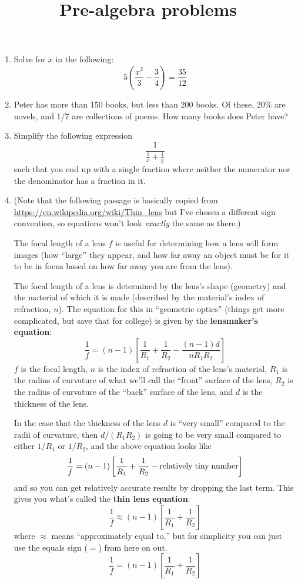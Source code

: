\documentclass[10pt,letterpaper,twoside]{article}
\title{Pre-algebra problems}
\begin{document}
 
\twocolumn
\maketitle
\begin{enumerate}
    \item Solve for $x$ in the following: $$ 5\left(\frac{x^2}{3} - \frac{3}{4} \right) = \frac{35}{12} $$
    \item Peter has more than 150 books, but less than 200 books. Of these, 20\% are novels, and 1/7 are collections of poems. How many books does Peter have?
    \item Simplify the following expression
            $$\frac{1}{\frac{1}{x} + \frac{1}{y}}$$
        such that you end up with a single fraction where neither the numerator nor the
        denominator has a fraction in it.
    \item (Note that the following passage is basically copied from
        \url{https://en.wikipedia.org/wiki/Thin\_lens} but I've chosen a different sign
        convention, so equations won't look {\it exactly} the same as there.)

        The focal length of a lens $f$ is useful for determining how a lens will
        form images (how ``large'' they appear, and how far away an object must be for
        it to be in focus based on how far away you are from the lens).

        The focal length of a lens is determined by the lens's shape (geometry) and the
        material of which it is made (described by the material's index of refraction,
        $n$). The equation for this in ``geometric optics'' (things get more
        complicated, but save that for college) is given by the {\bf lensmaker's
        equation}:
            $$\frac{1}{f} = (n - 1)\left[ \frac{1}{R_1} + \frac{1}{R_2} - \frac{(n - 1)d}{nR_1R_2} \right]$$
        $f$ is the focal length, $n$ is the index of refraction of the lens's material, $R_1$ is the radius
        of curvature of what we'll call the ``front'' surface of the lens, $R_2$ is the radius of curvature of the
        ``back'' surface of the lens, and $d$ is the thickness of the lens.

        In the case that the thickness of the lens $d$ is ``very small'' compared to
        the radii of curvature, then $d/(R_1R_2)$ is going to be very small compared to
        either $1/R_1$ or $1/R_2$, and the
        above equation looks like
            $$\frac{1}{f} = (n - 1)\left[ \frac{1}{R_1} + \frac{1}{R_2} - {\rm relatively\;tiny\;number} \right]$$
        and so you can get relatively accurate results by dropping the last term.
        This gives you what's called the {\bf thin lens equation}:
            $$\frac{1}{f} \approx (n - 1)\left[ \frac{1}{R_1} + \frac{1}{R_2} \right]$$
        where $\approx$ means ``approximately equal to,'' but for simplicity you can just
        use the equals sign ($=$) from here on out.
            $$\frac{1}{f} = (n - 1)\left[ \frac{1}{R_1} + \frac{1}{R_2} \right]$$


\end{enumerate}
\end{document}
